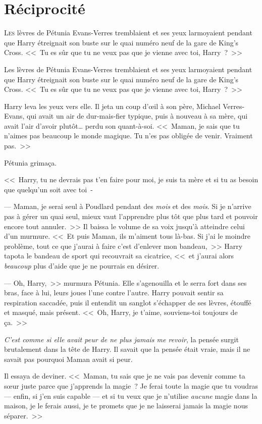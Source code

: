 \chapter{Réciprocité}

\lettrine{L}{es} lèvres de Pétunia Evans-Verres tremblaient et ses yeux larmoyaient pendant que Harry étreignait son buste sur le quai numéro neuf de la gare de King's Cross. <<~Tu es sûr que tu ne veux pas que je vienne avec toi, Harry~?~>>

Les lèvres de Pétunia Evans-Verres tremblaient et ses yeux larmoyaient pendant que Harry étreignait son buste sur le quai numéro neuf de la gare de King's Cross. <<~Tu es sûr que tu ne veux pas que je vienne avec toi, Harry~?~>>

Harry leva les yeux vers elle. Il jeta un coup d'œil à son père, Michael Verres-Evans, qui avait un air de dur-mais-fier typique, puis à nouveau à sa mère, qui avait l'air d'avoir plutôt… perdu son quant-à-soi. <<~Maman, je sais que tu n'aimes pas beaucoup le monde magique. Tu n'es pas obligée de venir. Vraiment pas.~>>

Pétunia grimaça.

<<~Harry, tu ne devrais pas t'en faire pour moi, je suis ta mère et si tu as besoin que quelqu'un soit avec toi~-

--- Maman, je serai seul à Poudlard pendant des \emph{mois} et des \emph{mois}. Si je n'arrive pas à gérer un quai seul, mieux vaut l'apprendre plus tôt que plus tard et pouvoir encore tout annuler.~>> Il baissa le volume de sa voix jusqu'à atteindre celui d'un murmure. <<~Et puis Maman, ils m'aiment tous là-bas. Si j'ai le moindre problème, tout ce que j'aurai à faire c'est d'enlever mon bandeau,~>> Harry tapota le bandeau de sport qui recouvrait sa cicatrice, <<~et j'aurai alors \emph{beaucoup} plus d'aide que je ne pourrais en désirer.

--- Oh, Harry,~>> murmura Pétunia. Elle s'agenouilla et le serra fort dans ses bras, face à lui, leurs joues l'une contre l'autre. Harry pouvait sentir sa respiration saccadée, puis il entendit un sanglot s'échapper de ses lèvres, étouffé et masqué, mais présent. <<~Oh, Harry, je t'aime, souviens-toi toujours de ça.~>>

\emph{C'est comme si elle avait peur de ne plus jamais me revoir}, la pensée surgit brutalement dans la tête de Harry. Il savait que la pensée était vraie, mais il ne savait pas pourquoi Maman avait si peur.

Il essaya de deviner. <<~Maman, tu sais que je ne vais pas devenir comme ta sœur juste parce que j'apprends la magie~? Je ferai toute la magie que tu voudras — enfin, si j'en suis capable — et si tu veux que je n'utilise \emph{aucune} magie dans la maison, je le ferais aussi, je te promets que je ne laisserai jamais la magie nous séparer.~>>

